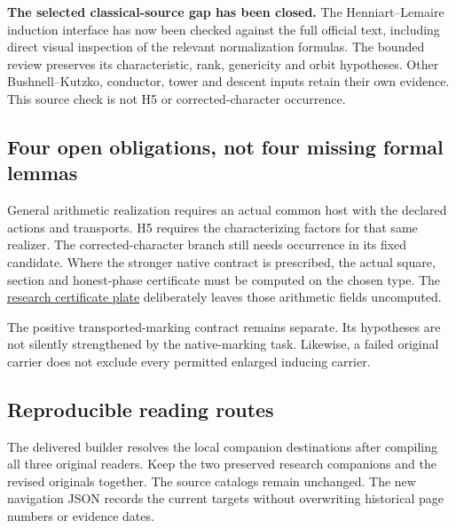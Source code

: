 \textbf{The selected classical-source gap has been closed.} The Henniart--Lemaire induction interface has now been checked against the full official text, including direct visual inspection of the relevant normalization formulas. The bounded review preserves its characteristic, rank, genericity and orbit hypotheses. Other Bushnell--Kutzko, conductor, tower and descent inputs retain their own evidence. This source check is not H5 or corrected-character occurrence.

\subsection*{Four open obligations, not four missing formal lemmas}
General arithmetic realization requires an actual common host with the declared actions and transports. H5 requires the characterizing factors for that same realizer. The corrected-character branch still needs occurrence in its fixed candidate. Where the stronger native contract is prescribed, the actual square, section and honest-phase certificate must be computed on the chosen type. The \href{https://komorebi.invalid/b07/lean_native}{research certificate plate} deliberately leaves those arithmetic fields uncomputed.

The positive transported-marking contract remains separate. Its hypotheses are not silently strengthened by the native-marking task. Likewise, a failed original carrier does not exclude every permitted enlarged inducing carrier.

\subsection*{Reproducible reading routes}
The delivered builder resolves the local companion destinations after compiling all three original readers. Keep the two preserved research companions and the revised originals together. The source catalogs remain unchanged. The new navigation JSON records the current targets without overwriting historical page numbers or evidence dates.
